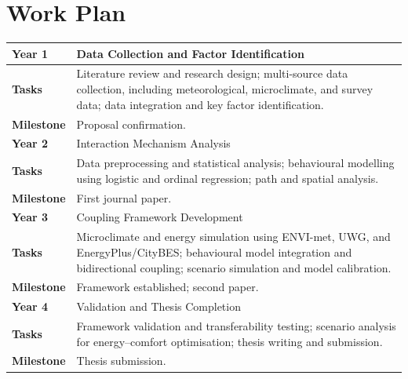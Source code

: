 \section{Work Plan}

\begin{tabularx}{\textwidth}{>{\bfseries}p{2.2cm}X}
\toprule
Year 1 & Data Collection and Factor Identification\\
\midrule
Tasks & Literature review and research design; multi-source data collection, including meteorological, microclimate, and survey data; data integration and key factor identification.\\
Milestone & Proposal confirmation.\\
\midrule
Year 2 & Interaction Mechanism Analysis\\
\midrule
Tasks & Data preprocessing and statistical analysis;
behavioural modelling using logistic and ordinal regression; 
path and spatial analysis.\\
Milestone & First journal paper.\\
\midrule
Year 3 & Coupling Framework Development\\
\midrule
Tasks & Microclimate and energy simulation using ENVI-met, UWG, and EnergyPlus/CityBES; behavioural model integration and bidirectional coupling; scenario simulation and model calibration.\\
Milestone & Framework established; second paper.\\
\midrule
Year 4 & Validation and Thesis Completion\\
\midrule
Tasks & Framework validation and transferability testing; scenario analysis for energy--comfort optimisation; thesis writing and submission.\\
Milestone & Thesis submission.\\
\bottomrule
\end{tabularx}
